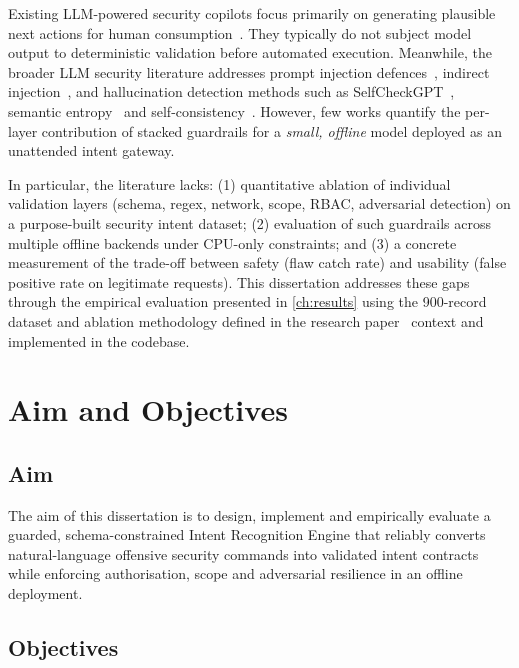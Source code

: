 Existing LLM-powered security copilots focus primarily on generating plausible next actions for human consumption~\cite{deng2024pentestgpt,happe2023pwned}. They typically do not subject model output to deterministic validation before automated execution. Meanwhile, the broader LLM security literature addresses prompt injection defences~\cite{liu2023promptinjection}, indirect injection~\cite{greshake2023indirect}, and hallucination detection methods such as SelfCheckGPT~\cite{manakul2023selfcheckgpt}, semantic entropy~\cite{farquhar2024semantic,kuhn2023semantic} and self-consistency~\cite{wang2023selfconsistency}. However, few works quantify the per-layer contribution of stacked guardrails for a \emph{small, offline} model deployed as an unattended intent gateway.

In particular, the literature lacks: (1) quantitative ablation of individual validation layers (schema, regex, network, scope, RBAC, adversarial detection) on a purpose-built security intent dataset; (2) evaluation of such guardrails across multiple offline backends under CPU-only constraints; and (3) a concrete measurement of the trade-off between safety (flaw catch rate) and usability (false positive rate on legitimate requests). This dissertation addresses these gaps through the empirical evaluation presented in \cref{ch:results} using the 900-record dataset and ablation methodology defined in the research paper~\cite{deng2024pentestgpt,greshake2023indirect,farquhar2024semantic} context and implemented in the codebase.

\section{Aim and Objectives}\label{sec:intro-aim}

\subsection{Aim}

The aim of this dissertation is to design, implement and empirically evaluate a guarded, schema-constrained Intent Recognition Engine that reliably converts natural-language offensive security commands into validated intent contracts while enforcing authorisation, scope and adversarial resilience in an offline deployment.

\subsection{Objectives}

